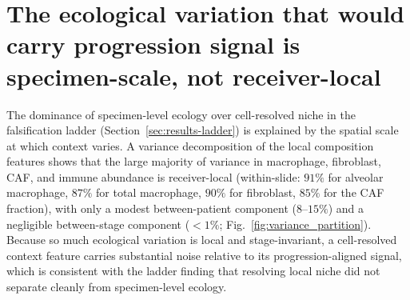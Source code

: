 \section{The ecological variation that would carry progression signal is specimen-scale, not receiver-local}
\label{sec:results-scale}

The dominance of specimen-level ecology over cell-resolved niche in the falsification ladder (Section~\ref{sec:results-ladder}) is explained by the spatial scale at which context varies. A variance decomposition of the local composition features shows that the large majority of variance in macrophage, fibroblast, CAF, and immune abundance is receiver-local (within-slide: $91\%$ for alveolar macrophage, $87\%$ for total macrophage, $90\%$ for fibroblast, $85\%$ for the CAF fraction), with only a modest between-patient component ($8$--$15\%$) and a negligible between-stage component ($<1\%$; Fig.~\ref{fig:variance_partition}). Because so much ecological variation is local and stage-invariant, a cell-resolved context feature carries substantial noise relative to its progression-aligned signal, which is consistent with the ladder finding that resolving local niche did not separate cleanly from specimen-level ecology.

